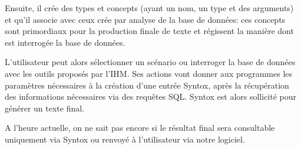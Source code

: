 \documentclass[12pt]{report}
\begin{document}
Ensuite, il crée des types et concepts (ayant un nom, un type et des arguments) et qu'il associe avec ceux crée par analyse de la base de données: ces concepts sont primordiaux pour la production finale de texte et régissent la manière dont est interrogée la base de données.



L'utilisateur peut alors sélectionner un scénario ou interroger la base de données avec les outils proposés par l'IHM. Ses actions vont donner aux programmes les paramètres nécessaires à la création d'une entrée Syntox, après la récupération des informations nécessaires via des requêtes SQL. Syntox est alors sollicité pour générer un texte final.

A l'heure actuelle, on ne sait pas encore si le résultat final sera consultable uniquement via Syntox ou renvoyé à l'utilisateur via notre logiciel.
\end{document}
